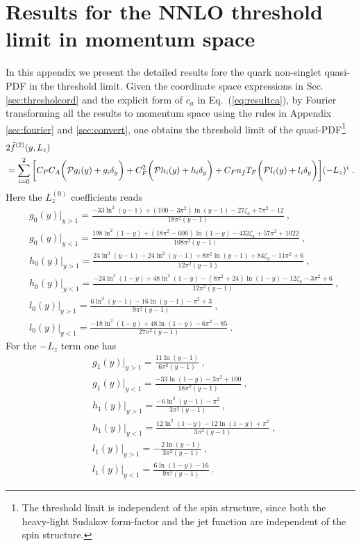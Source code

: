 \documentclass[a4paper,11pt]{article}
\begin{document}
\section{Results for the NNLO threshold limit in momentum space}\label{sec: NNLOmomemtum}
In this appendix we present the detailed results fore the quark non-singlet quasi-PDF 
in the threshold limit. Given the coordinate space expressions in Sec. \ref{sec:thresholcord} and the explicit form of $c_a$ in Eq.~(\ref{eq:resultca}), by Fourier transforming all the results to momentum space using the rules in Appendix \ref{sec:fourier} and \ref{sec:convert},  one obtains the threshold limit of the quasi-PDF\footnote{The threshold limit is independent of the spin structure, since both the heavy-light Sudakov form-factor and the jet function are independent of the spin structure.}
\begin{align}
&2\tilde f^{(2)}(y,L_z)\nonumber \\ 
&=\sum_{i=0}^{2}\bigg[C_FC_A\bigg({\cal P}g_i(y)+g_i\delta_y\bigg)+C_F^2\bigg({\cal P}h_i(y)+h_i\delta_y\bigg)+C_Fn_fT_F\bigg({\cal P}l_i(y)+l_i\delta_y\bigg)\bigg](-L_z)^i\ . 
\end{align}
Here the $L_z^{(0)}$ coefficients reads
\begin{align}
&g_0(y)|_{y>1}=\frac{-33 \ln ^2(y-1)+(100-3 \pi ^2)\ln (y-1)-27 \zeta_3+7 \pi ^2-12}{18 \pi ^2 (y-1)} \ , \\ 
&g_0(y)|_{y<1}=\frac{198 \ln ^2(1-y)+(18 \pi ^2-600) \ln (1-y)-432 \zeta_3+57 \pi ^2+1022}{108 \pi ^2 (y-1)} \ , \\ 
&h_0(y)|_{y>1}=\frac{24 \ln^3(y-1)-24 \ln ^2(y-1)+8 \pi ^2 \ln(y-1)+84 \zeta_3-11 \pi ^2+6}{12 \pi ^2 (y-1)} \ , \\
&h_0(y)|_{y<1}=\frac{-24 \ln ^3(1-y)+48 \ln ^2(1-y)-(8 \pi ^2 +24)\ln(1-y)-12 \zeta_3-3 \pi ^2+6}{12 \pi ^2 (y-1)}\ , \\
&l_0(y)|_{y>1}=\frac{6 \ln^2(y-1)-16 \ln(y-1)-\pi ^2+3}{9 \pi ^2 (y-1)} \ , \\ 
&l_{0}(y)|_{y<1}=\frac{-18 \ln^2(1-y)+48 \ln (1-y)-6 \pi ^2-85}{27 \pi ^2 (y-1)}\ .
\end{align}
For the $-L_z$ term one has
\begin{align}
&g_{1}(y)|_{y>1}=\frac{11 \ln(y-1)}{6 \pi ^2 (y-1)} \ , \\ 
&g_1(y)|_{y<1}=\frac{-33 \ln (1-y)-3 \pi ^2+100}{18 \pi ^2 (y-1)}\ , \\ 
&h_1(y)|_{y>1}=\frac{-6 \ln ^2(y-1)-\pi ^2}{3 \pi ^2 (y-1)} \ , \\
&h_{1}(y)|_{y<1}=\frac{12 \ln ^2(1-y)-12 \ln(1-y)+\pi ^2}{3 \pi ^2 (y-1)} \ , \\
&l_{1}(y)|_{y>1}=-\frac{2 \ln(y-1)}{3 \pi ^2 (y-1)}\ , \\ 
&l_{1}(y)|_{y<1}=\frac{6 \ln (1-y)-16}{9 \pi ^2 (y-1)}\ .
\end{align}
\end{document}
